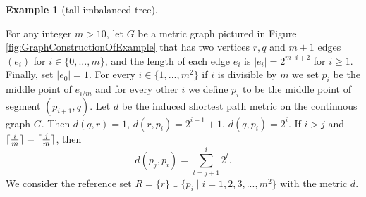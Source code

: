 \documentclass{vgtc}                          %
\numberwithin{algocf}{section}
\theoremstyle{definition}
\theoremstyle{definition}
\newtheorem{exa}[algocf]{Example}
\theoremstyle{definition}
\theoremstyle{plain}
\DeclarePairedDelimiter\ceil{\lceil}{\rceil}
\begin{document}
\begin{exa}[tall imbalanced tree]
	\label{exa:tall_imbalanced_tree}
	
	For any integer $m > 10$, let $G$ be a metric graph pictured in Figure \ref{fig:GraphConstructionOfExample} that has two vertices $r,q$ and $m+1$ edges $(e_i)$ for $i \in \{0, ..., m\}$, and the length of each edge $e_i$ is $|e_i| = 2^{m \cdot i +2}$ for $i \geq 1$.
	Finally, set $|e_0| = 1$. For every $i \in \{1, ..., m^2\}$ if $i$ is divisible by $m$ we set $p_{i}$ be the middle point of $e_{i / m}$ and for every other $i$ we define $p_i$ to be the middle point of segment $(p_{i+1}, q)$. 
	Let $d$ be the induced shortest path metric on the continuous graph $G$.
	Then $d(q,r) = 1$, $d(r, p_{i}) = 2^{i+1} + 1$, $d(q,p_{i}) = 2^{i} $.
	If $i > j $ and $\ceil{\frac{i}{m}} = \ceil{\frac{j}{m}}$, then $$ d(p_{j}, p_{i})  = \sum\limits_{t = j+1}^{i} 2^{t}.$$
	We consider the reference set $R = \{r\} \cup \{p_{i} \mid i=1,2,3,...,m^2 \}$ with the metric $d$.
	

\end{exa}
\end{document}
